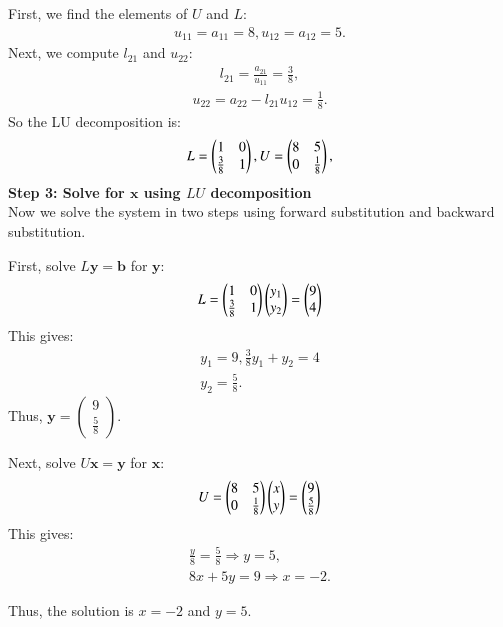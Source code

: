\documentclass[journal]{IEEEtran}
\begin{document}
First, we find the elements of $U$ and $L$:  
\begin{align}  
u_{11} = a_{11} = 8, u_{12} = a_{12} = 5.  
\end{align}  
Next, we compute $l_{21}$ and $u_{22}$:  
\begin{align}  
l_{21} = \frac{a_{21}}{u_{11}} = \frac{3}{8},  
\end{align}  
\begin{align}  
u_{22} = a_{22} - l_{21} u_{12} =  \frac{1}{8}.  
\end{align}  
So the LU decomposition is:  
\begin{align}
    L=\begin{pmatrix}1 & 0\\ \frac{3}{8} & 1\end{pmatrix},
    U=\begin{pmatrix}8 & 5\\0 & \frac{1}{8}\end{pmatrix},
\end{align}
\textbf{Step 3: Solve for $\mathbf{x}$ using $LU$ decomposition}  \\
Now we solve the system in two steps using forward substitution and backward substitution.  

First, solve $L \mathbf{y} = \mathbf{b}$ for $\mathbf{y}$:  
\begin{align}  
     L=\begin{pmatrix}1 & 0\\ \frac{3}{8}& 1\end{pmatrix}\begin{pmatrix}y_1\\y_2\end{pmatrix} = \begin{pmatrix}9\\4\end{pmatrix}
\end{align}  
This gives:  
\begin{align}  
y_1 = 9, \frac{3}{8}y_1 + y_2 = 4 \\
 y_2 = \frac{5}{8}.  
\end{align}  
Thus, $\mathbf{y} = \begin{pmatrix} 9 \\  \frac{5}{8} \end{pmatrix}$.  

Next, solve $U \mathbf{x} = \mathbf{y}$ for $\mathbf{x}$:  
\begin{align}
    U=\begin{pmatrix}8 & 5\\0 & \frac{1}{8}\end{pmatrix}\begin{pmatrix}x \\ y\end{pmatrix} = \begin{pmatrix}9\\ \frac{5}{8}\end{pmatrix}
\end{align}
This gives:  
\begin{align}  
\frac{y}{8} = \frac{5}{8} \Rightarrow y = 5, \\  
8x + 5y = 9\Rightarrow x= -2.  
\end{align}  

Thus, the solution is $x = -2$ and $y = 5$.  
\end{document}
